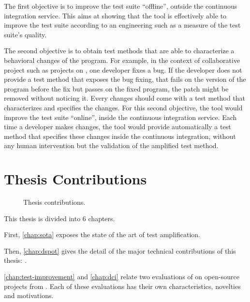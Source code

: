 The first objective is to improve the test suite ``offline'', \ie outside the continuous integration service.
This aims at showing that the tool is effectively able to improve the test suite according to an engineering such as a measure of the test suite's quality.

The second objective is to obtain test methods that are able to characterize a behavioral changes of the program.
For example, in the context of collaborative project such as projects on \gh, one developer fixes a bug.
If the developer does not provide a test method that exposes the bug fixing, \ie that fails on the version of the program before the fix but passes on the fixed program, the patch might be removed without noticing it.
Every changes should come with a test method that characterizes and specifies the changes.
For this second objective, the tool would improve the test suite ``online'', \ie inside the continuous integration service.
Each time a developer makes changes, the tool would provide automatically a test method that specifies these changes inside the continuous integration, without any human intervention but the validation of the amplified test method.

\section{Thesis Contributions}
\label{sec:intro:contributions}

\begin{figure}[h]
	\centering
	\caption{Thesis contributions.}
	\label{fig:intro:roadmap}
\end{figure}

This thesis is divided into 6 chapters.

First, \autoref{chap:sota} exposes the state of the art of test amplification.

Then, \autoref{chap:dspot} gives the detail of the major technical contributions of this thesis: \dspot.

\autoref{chap:test-improvement} and \autoref{chap:dci} relate two evaluations of \dspot on open-source projects from \gh.
Each of these evaluations has their own characteristics, novelties and motivations.

